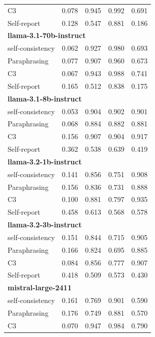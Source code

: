 \documentclass[11pt]{article}
\theoremstyle{plain}
\theoremstyle{definition}
\theoremstyle{remark}
\begin{document}
\begin{table}[p]
\begin{minipage}[t]{0.48\textwidth}
\begin{tabular}{lcccc}
       C3             & 0.078 & 0.945 & 0.992 & 0.691 \\
        Self-report      & 0.128 & 0.547 & 0.881 & 0.186 \\
        \midrule
        \multicolumn{5}{l}{\textbf{llama-3.1-70b-instruct}} \\
        self-consistency & 0.062 & 0.927 & 0.980 & 0.693 \\
        Paraphrasing     & 0.077 & 0.907 & 0.960 & 0.673 \\
       C3             & 0.067 & 0.943 & 0.988 & 0.741 \\
        Self-report      & 0.165 & 0.512 & 0.838 & 0.175 \\
        \midrule
        \multicolumn{5}{l}{\textbf{llama-3.1-8b-instruct}} \\
        self-consistency & 0.053 & 0.904 & 0.902 & 0.901 \\
        Paraphrasing     & 0.068 & 0.884 & 0.882 & 0.881 \\
       C3             & 0.156 & 0.907 & 0.904 & 0.917 \\
        Self-report      & 0.362 & 0.538 & 0.639 & 0.419 \\
        \midrule
        \multicolumn{5}{l}{\textbf{llama-3.2-1b-instruct}} \\
        self-consistency & 0.141 & 0.856 & 0.751 & 0.908 \\
        Paraphrasing     & 0.156 & 0.836 & 0.731 & 0.888 \\
       C3             & 0.100 & 0.881 & 0.797 & 0.935 \\
        Self-report      & 0.458 & 0.613 & 0.568 & 0.578 \\
        \midrule
        \multicolumn{5}{l}{\textbf{llama-3.2-3b-instruct}} \\
        self-consistency & 0.151 & 0.844 & 0.715 & 0.905 \\
        Paraphrasing     & 0.166 & 0.824 & 0.695 & 0.885 \\
       C3             & 0.084 & 0.856 & 0.777 & 0.907 \\
        Self-report      & 0.418 & 0.509 & 0.573 & 0.430 \\
        \midrule
        \multicolumn{5}{l}{\textbf{mistral-large-2411}} \\
        self-consistency & 0.161 & 0.769 & 0.901 & 0.590 \\
        Paraphrasing     & 0.176 & 0.749 & 0.881 & 0.570 \\
       C3             & 0.070 & 0.947 & 0.984 & 0.790 \\

\end{tabular}
\end{minipage}
\end{table}
\end{document}
